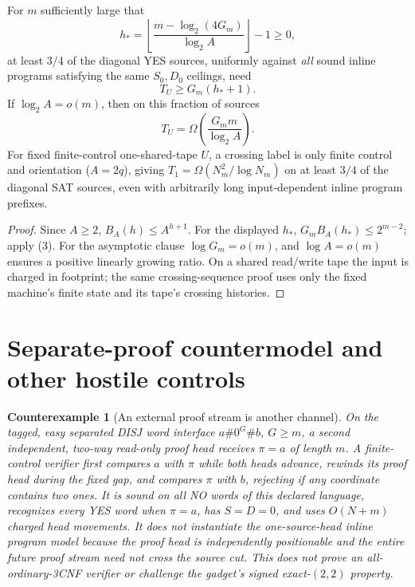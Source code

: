 \documentclass[11pt]{article}
\newtheorem{counterexample}[theorem]{Counterexample}
\begin{document}
\begin{corollary}
\label{cor:tail}
For $m$ sufficiently large that
\[
 h_*=\left\lfloor\frac{m-\log_2(4G_m)}
                       {\log_2 A}\right\rfloor-1\ge0,
\]
at least $3/4$ of the diagonal YES sources, uniformly
against \emph{all} sound inline programs satisfying the
same $S_0,D_0$ ceilings, need
\[
 T_U\ge G_m(h_*+1).                           \tag{4}
\]
If $\log_2 A=o(m)$, then on this fraction of sources
\[
 T_U=\Omega\left(
  \frac{G_m m}{\log_2 A}\right).
\]
For fixed finite-control one-shared-tape $U$, a crossing
label is only finite control and orientation
($A=2q$), giving
$T_1=\Omega(N_m^2/\log N_m)$ on at least $3/4$
of the diagonal SAT sources, even with arbitrarily long
input-dependent inline program prefixes.
\end{corollary}
\begin{proof}
Since $A\ge2$,
$B_A(h)\le A^{h+1}$. For the displayed $h_*$,
$G_m B_A(h_*)\le2^{m-2}$; apply (3).
For the asymptotic clause $\log G_m=o(m)$, and
$\log A=o(m)$ ensures a positive linearly growing
ratio. On a shared read/write tape the input is
charged in footprint; the same crossing-sequence
proof uses only the fixed machine's finite state
and its tape's crossing histories.
\end{proof}

\section{Separate-proof countermodel and other hostile controls}
\begin{counterexample}[An external proof stream is another channel]
On the \emph{tagged, easy} separated DISJ word interface
$a\#0^{G}\#b$, $G\ge m$, a second independent,
two-way \emph{read-only proof head} receives
$\pi=a$ of length $m$. A finite-control verifier first
compares $a$ with $\pi$ while both heads advance,
rewinds its proof head during the fixed gap, and
compares $\pi$ with $b$, rejecting if any coordinate
contains two ones. It is sound on all NO words of this
declared language, recognizes every YES word when
$\pi=a$, has $S=D=0$, and uses
$O(N+m)$ charged head movements.
It does \emph{not} instantiate the one-source-head
inline program model because the proof head is
independently positionable and the entire future
proof stream need not cross the source cut. This
does not prove an all-ordinary-3CNF verifier or
challenge the gadget's signed exact-$(2,2)$ property.
\end{counterexample}
\end{document}
